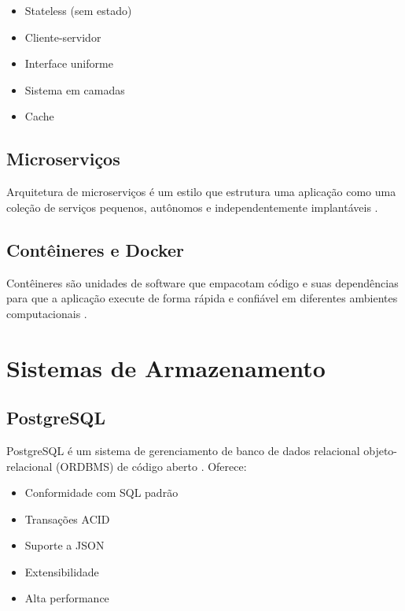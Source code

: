 \begin{itemize}
    \item Stateless (sem estado)
    \item Cliente-servidor
    \item Interface uniforme
    \item Sistema em camadas
    \item Cache
\end{itemize}

\subsection{Microserviços}

Arquitetura de microserviços é um estilo que estrutura uma aplicação como uma coleção de serviços pequenos, autônomos e independentemente implantáveis \cite{newman2015}.

\subsection{Contêineres e Docker}

Contêineres são unidades de software que empacotam código e suas dependências para que a aplicação execute de forma rápida e confiável em diferentes ambientes computacionais \cite{merkel2014}.

\section{Sistemas de Armazenamento}

\subsection{PostgreSQL}

PostgreSQL é um sistema de gerenciamento de banco de dados relacional objeto-relacional (ORDBMS) de código aberto \cite{stonebraker1986}. Oferece:

\begin{itemize}
    \item Conformidade com SQL padrão
    \item Transações ACID
    \item Suporte a JSON
    \item Extensibilidade
    \item Alta performance
\end{itemize}

